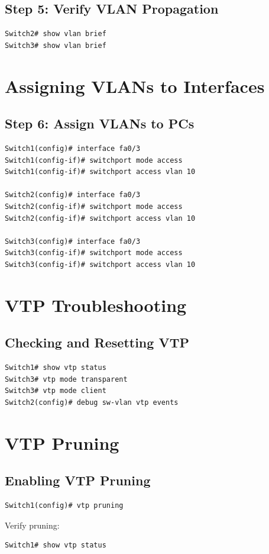 \documentclass[a4paper]{book}
\begin{document}
\subsection{Step 5: Verify VLAN Propagation}
\begin{lstlisting}
Switch2# show vlan brief
Switch3# show vlan brief
\end{lstlisting}

\section{Assigning VLANs to Interfaces}
\subsection{Step 6: Assign VLANs to PCs}
\begin{lstlisting}
Switch1(config)# interface fa0/3
Switch1(config-if)# switchport mode access
Switch1(config-if)# switchport access vlan 10

Switch2(config)# interface fa0/3
Switch2(config-if)# switchport mode access
Switch2(config-if)# switchport access vlan 10

Switch3(config)# interface fa0/3
Switch3(config-if)# switchport mode access
Switch3(config-if)# switchport access vlan 10
\end{lstlisting}

\section{VTP Troubleshooting}
\subsection{Checking and Resetting VTP}
\begin{lstlisting}
Switch1# show vtp status
Switch3# vtp mode transparent
Switch3# vtp mode client
Switch2(config)# debug sw-vlan vtp events
\end{lstlisting}

\section{VTP Pruning}
\subsection{Enabling VTP Pruning}
\begin{lstlisting}
Switch1(config)# vtp pruning
\end{lstlisting}
Verify pruning:
\begin{lstlisting}
Switch1# show vtp status
\end{lstlisting}
\end{document}
